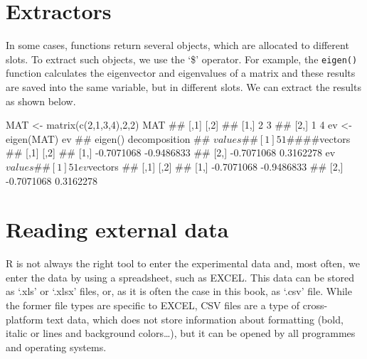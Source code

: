 \documentclass[a4paper,12pt,oneside]{book}
\newenvironment{Shaded}{\begin{snugshade}}{\end{snugshade}}
\newcommand{\DecValTok}[1]{#1}
\newcommand{\SpecialCharTok}[1]{#1}
\newcommand{\DocumentationTok}[1]{#1}
\newcommand{\OtherTok}[1]{#1}
\newcommand{\FunctionTok}[1]{#1}
\newcommand{\NormalTok}[1]{#1}
\begin{document}
\hypertarget{extractors}{%
\section{Extractors}\label{extractors}}

In some cases, functions return several objects, which are allocated to different slots. To extract such objects, we use the `\$' operator. For example, the \texttt{eigen()} function calculates the eigenvector and eigenvalues of a matrix and these results are saved into the same variable, but in different slots. We can extract the results as shown below.

\begin{Shaded}
\begin{Highlighting}[]
\NormalTok{MAT  }\OtherTok{\textless{}{-}}  \FunctionTok{matrix}\NormalTok{(}\FunctionTok{c}\NormalTok{(}\DecValTok{2}\NormalTok{,}\DecValTok{1}\NormalTok{,}\DecValTok{3}\NormalTok{,}\DecValTok{4}\NormalTok{),}\DecValTok{2}\NormalTok{,}\DecValTok{2}\NormalTok{)}
\NormalTok{MAT}
\DocumentationTok{\#\#      [,1] [,2]}
\DocumentationTok{\#\# [1,]    2    3}
\DocumentationTok{\#\# [2,]    1    4}
\NormalTok{ev  }\OtherTok{\textless{}{-}}  \FunctionTok{eigen}\NormalTok{(MAT)}
\NormalTok{ev}
\DocumentationTok{\#\# eigen() decomposition}
\DocumentationTok{\#\# $values}
\DocumentationTok{\#\# [1] 5 1}
\DocumentationTok{\#\# }
\DocumentationTok{\#\# $vectors}
\DocumentationTok{\#\#            [,1]       [,2]}
\DocumentationTok{\#\# [1,] {-}0.7071068 {-}0.9486833}
\DocumentationTok{\#\# [2,] {-}0.7071068  0.3162278}
\NormalTok{ev}\SpecialCharTok{$}\NormalTok{values}
\DocumentationTok{\#\# [1] 5 1}
\NormalTok{ev}\SpecialCharTok{$}\NormalTok{vectors}
\DocumentationTok{\#\#            [,1]       [,2]}
\DocumentationTok{\#\# [1,] {-}0.7071068 {-}0.9486833}
\DocumentationTok{\#\# [2,] {-}0.7071068  0.3162278}
\end{Highlighting}
\end{Shaded}

\hypertarget{reading-external-data}{%
\section{Reading external data}\label{reading-external-data}}

R is not always the right tool to enter the experimental data and, most often, we enter the data by using a spreadsheet, such as EXCEL. This data can be stored as `.xls' or `.xlsx' files, or, as it is often the case in this book, as `.csv' file. While the former file types are specific to EXCEL, CSV files are a type of cross-platform text data, which does not store information about formatting (bold, italic or lines and background colors\ldots), but it can be opened by all programmes and operating systems.
\end{document}
